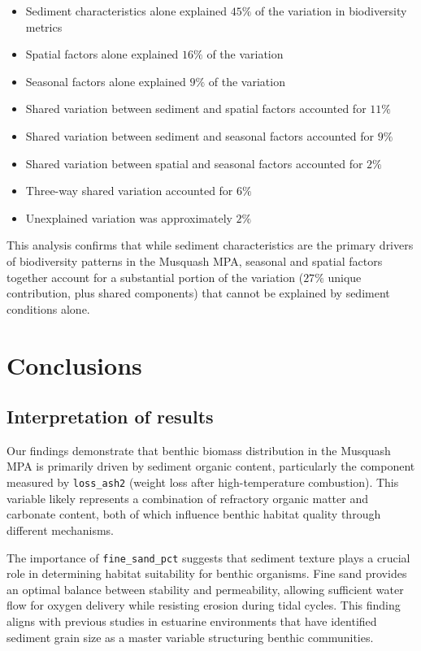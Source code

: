 \documentclass[12pt]{article}
\begin{document}
\begin{itemize}

    \item Sediment characteristics alone explained $45\%$ of the variation in biodiversity metrics
    \item Spatial factors alone explained $16\%$ of the variation
    \item Seasonal factors alone explained $9\%$ of the variation
    \item Shared variation between sediment and spatial factors accounted for $11\%$
    \item Shared variation between sediment and seasonal factors accounted for $9\%$
    \item Shared variation between spatial and seasonal factors accounted for $2\%$
    \item Three-way shared variation accounted for $6\%$
    \item Unexplained variation was approximately $2\%$
\end{itemize}

This analysis confirms that while sediment characteristics are the primary drivers of biodiversity patterns in the Musquash MPA, seasonal and spatial factors together account for a substantial portion of the variation ($27\%$ unique contribution, plus shared components) that cannot be explained by sediment conditions alone.


\newpage
\section{Conclusions}
\subsection{Interpretation of results}

\qquad Our findings demonstrate that benthic biomass distribution in the Musquash MPA is primarily driven by sediment organic content, particularly the component measured by \texttt{loss\_ash2} (weight loss after high-temperature combustion). This variable likely represents a combination of refractory organic matter and carbonate content, both of which influence benthic habitat quality through different mechanisms.

\qquad The importance of \texttt{fine\_sand\_pct} suggests that sediment texture plays a crucial role in determining habitat suitability for benthic organisms. Fine sand provides an optimal balance between stability and permeability, allowing sufficient water flow for oxygen delivery while resisting erosion during tidal cycles. This finding aligns with previous studies in estuarine environments that have identified sediment grain size as a master variable structuring benthic communities\cite{glud2008oxygen}.
\end{document}
